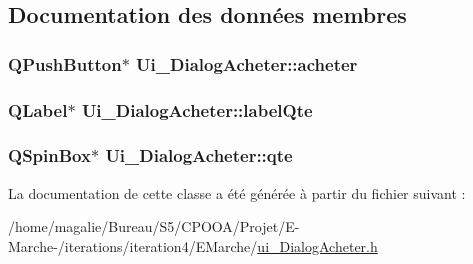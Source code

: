 \subsection{Documentation des données membres}
\hypertarget{class_ui___dialog_acheter_af6b53b197038b75c9c93a5a2bd7775a4}{
\subsubsection[{acheter}]{\setlength{\rightskip}{0pt plus 5cm}Q\-Push\-Button$\ast$ Ui\-\_\-\-Dialog\-Acheter\-::acheter}}\label{class_ui___dialog_acheter_af6b53b197038b75c9c93a5a2bd7775a4}
\hypertarget{class_ui___dialog_acheter_adfd72bae8a9c183780299127920f4438}{
\subsubsection[{label\-Qte}]{\setlength{\rightskip}{0pt plus 5cm}Q\-Label$\ast$ Ui\-\_\-\-Dialog\-Acheter\-::label\-Qte}}\label{class_ui___dialog_acheter_adfd72bae8a9c183780299127920f4438}
\hypertarget{class_ui___dialog_acheter_a21affb75243ff68116a045006c8ac3f6}{
\subsubsection[{qte}]{\setlength{\rightskip}{0pt plus 5cm}Q\-Spin\-Box$\ast$ Ui\-\_\-\-Dialog\-Acheter\-::qte}}\label{class_ui___dialog_acheter_a21affb75243ff68116a045006c8ac3f6}


La documentation de cette classe a été générée à partir du fichier suivant \-:\begin{DoxyCompactItemize}
\item 
/home/magalie/\-Bureau/\-S5/\-C\-P\-O\-O\-A/\-Projet/\-E-\/\-Marche-\//iterations/iteration4/\-E\-Marche/\hyperlink{ui___dialog_acheter_8h}{ui\-\_\-\-Dialog\-Acheter.\-h}\end{DoxyCompactItemize}
